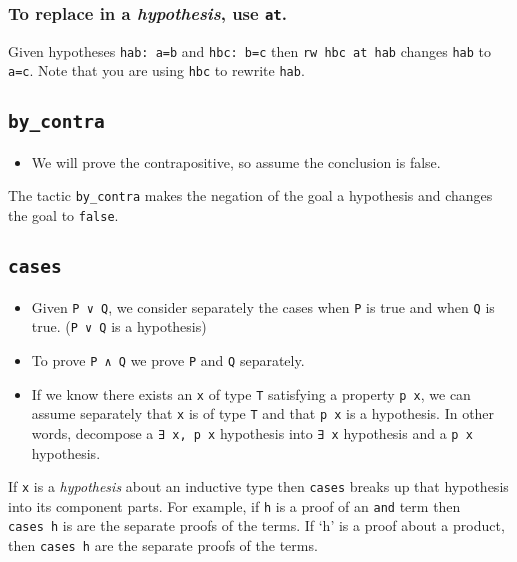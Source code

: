 \hypertarget{to-replace-in-a-hypothesis-use-at.}{%
\subsubsection{\texorpdfstring{To replace in a \emph{hypothesis}, use
\texttt{at}.}{To replace in a hypothesis, use at.}}\label{to-replace-in-a-hypothesis-use-at.}}

Given hypotheses \texttt{hab:\ a=b} and \texttt{hbc:\ b=c} then
\texttt{rw\ hbc\ at\ hab} changes \texttt{hab} to \texttt{a=c}. Note
that you are using \texttt{hbc} to rewrite \texttt{hab}.

\hypertarget{by_contra}{%
\subsection{\texorpdfstring{\texttt{by\_contra}}{by\_contra}}\label{by_contra}}

\begin{itemize}
\tightlist
\item
  We will prove the contrapositive, so assume the conclusion is false.
\end{itemize}

The tactic \texttt{by\_contra} makes the negation of the goal a
hypothesis and changes the goal to \texttt{false}.

\hypertarget{cases}{%
\subsection{\texorpdfstring{\texttt{cases}}{cases}}\label{cases}}

\begin{itemize}
\tightlist
\item
  Given \texttt{P\ ∨\ Q}, we consider separately the cases when
  \texttt{P} is true and when \texttt{Q} is true. (\texttt{P\ ∨\ Q} is a
  hypothesis)
\item
  To prove \texttt{P\ ∧\ Q} we prove \texttt{P} and \texttt{Q}
  separately.
\item
  If we know there exists an \texttt{x} of type \texttt{T} satisfying a
  property \texttt{p\ x}, we can assume separately that \texttt{x} is of
  type \texttt{T} and that \texttt{p\ x} is a hypothesis. In other
  words, decompose a \texttt{∃\ x,\ p\ x} hypothesis into \texttt{∃\ x}
  hypothesis and a \texttt{p\ x} hypothesis.
\end{itemize}

If \texttt{x} is a \emph{hypothesis} about an inductive type then
\texttt{cases} breaks up that hypothesis into its component parts. For
example, if \texttt{h} is a proof of an \texttt{and} term then
\texttt{cases\ h} is are the separate proofs of the terms. If `h' is a
proof about a product, then \texttt{cases\ h} are the separate proofs of
the terms.

